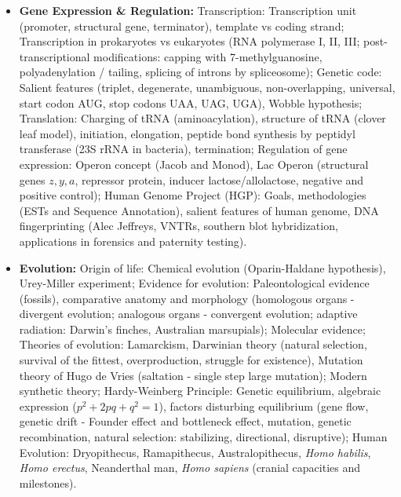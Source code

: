 \documentclass[11pt,a4paper]{article}
\begin{document}
\begin{itemize}
  \item \textbf{Gene Expression \& Regulation:} Transcription: Transcription unit (promoter, structural gene, terminator), template vs coding strand; Transcription in prokaryotes vs eukaryotes (RNA polymerase I, II, III; post-transcriptional modifications: capping with 7-methylguanosine, polyadenylation / tailing, splicing of introns by spliceosome); Genetic code: Salient features (triplet, degenerate, unambiguous, non-overlapping, universal, start codon AUG, stop codons UAA, UAG, UGA), Wobble hypothesis; Translation: Charging of tRNA (aminoacylation), structure of tRNA (clover leaf model), initiation, elongation, peptide bond synthesis by peptidyl transferase (23S rRNA in bacteria), termination; Regulation of gene expression: Operon concept (Jacob and Monod), Lac Operon (structural genes $z, y, a$, repressor protein, inducer lactose/allolactose, negative and positive control); Human Genome Project (HGP): Goals, methodologies (ESTs and Sequence Annotation), salient features of human genome, DNA fingerprinting (Alec Jeffreys, VNTRs, southern blot hybridization, applications in forensics and paternity testing).
  \item \textbf{Evolution:} Origin of life: Chemical evolution (Oparin-Haldane hypothesis), Urey-Miller experiment; Evidence for evolution: Paleontological evidence (fossils), comparative anatomy and morphology (homologous organs - divergent evolution; analogous organs - convergent evolution; adaptive radiation: Darwin's finches, Australian marsupials); Molecular evidence; Theories of evolution: Lamarckism, Darwinian theory (natural selection, survival of the fittest, overproduction, struggle for existence), Mutation theory of Hugo de Vries (saltation - single step large mutation); Modern synthetic theory; Hardy-Weinberg Principle: Genetic equilibrium, algebraic expression ($p^2 + 2pq + q^2 = 1$), factors disturbing equilibrium (gene flow, genetic drift - Founder effect and bottleneck effect, mutation, genetic recombination, natural selection: stabilizing, directional, disruptive); Human Evolution: Dryopithecus, Ramapithecus, Australopithecus, \textit{Homo habilis}, \textit{Homo erectus}, Neanderthal man, \textit{Homo sapiens} (cranial capacities and milestones).
\end{itemize}
\end{document}
